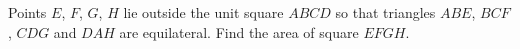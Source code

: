 Points $E$, $F$, $G$, $H$ lie outside the unit square $ABCD$ so that triangles $ABE$, $BCF$, $CDG$ and $DAH$ are equilateral. Find the area of square $EFGH$.
